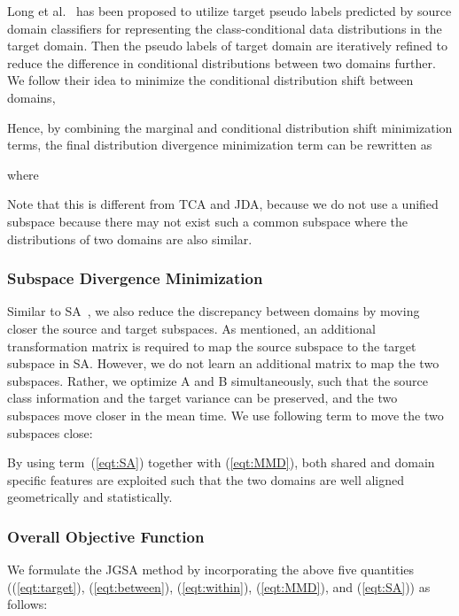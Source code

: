\documentclass[10pt,twocolumn,letterpaper]{article}
\begin{document}
Long et al.~\cite{Long2013} has been proposed to utilize target pseudo labels predicted by source domain classifiers for representing the class-conditional data distributions in the target domain. Then the pseudo labels of target domain are iteratively refined to reduce the difference in conditional distributions between two domains further. We follow their idea to minimize the conditional distribution shift between domains,

Hence, by combining the marginal and conditional distribution shift minimization terms, the final distribution divergence minimization term can be rewritten as 

where 
\begin{small}

\vspace{-1em}

\vspace{-1em}

\vspace{-1em}

\end{small}
Note that this is different from TCA and JDA, because we do not use a unified subspace because there may not exist such a common subspace where the distributions of two domains are also similar.

\subsubsection{Subspace Divergence Minimization}
Similar to SA~\cite{Fernando2013}, we also reduce the discrepancy between domains by moving closer the source and target subspaces. As mentioned, an additional transformation matrix  is required to map the source subspace to the target subspace in SA. However, we do not learn an additional matrix to map the two subspaces. Rather, we optimize A and B simultaneously, such that the source class information and the target variance can be preserved, and the two subspaces move closer in the mean time.
We use following term to move the two subspaces close:
 
By using term~(\ref{eqt:SA}) together with (\ref{eqt:MMD}), 
both shared and domain specific features are exploited such that the two domains are well aligned geometrically and statistically.


\subsubsection{Overall Objective Function}
We formulate the JGSA method by incorporating the above five quantities ((\ref{eqt:target}), (\ref{eqt:between}), (\ref{eqt:within}), (\ref{eqt:MMD}), and (\ref{eqt:SA})) as follows:
\end{document}
